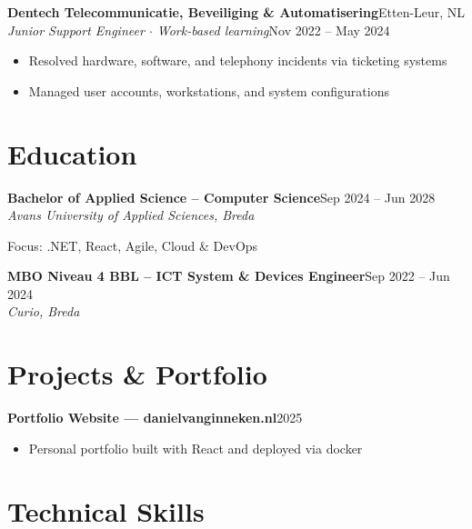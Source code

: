 \documentclass[a4paper,10pt]{article}
\newcommand{\cventry}[4]{%
  {\textbf{#1}}\hfill{\small\color{lightgray}#2}\\
  {\textit{#3}}\hfill{\small\color{lightgray}#4}\vspace{2pt}%
}
\newcommand{\cvsimple}[2]{%
  {\textbf{#1}}\hfill{\small\color{lightgray}#2}\vspace{1pt}%
}
\begin{document}
\vspace{4pt}

\cventry{Dentech Telecommunicatie, Beveiliging \& Automatisering}{Etten-Leur, NL}%
        {Junior Support Engineer $\cdot$ Work-based learning}{Nov 2022 -- May 2024}
\begin{itemize}
  \item Resolved hardware, software, and telephony incidents via ticketing systems
  \item Managed user accounts, workstations, and system configurations
\end{itemize}

\section{Education}

\cventry{Bachelor of Applied Science -- Computer Science}{Sep 2024 -- Jun 2028}%
        {Avans University of Applied Sciences, Breda}{}
\vspace{-1pt}
{\small Focus: .NET, React, Agile, Cloud \& DevOps}

\vspace{4pt}

\cventry{MBO Niveau 4 BBL -- ICT System \& Devices Engineer}{Sep 2022 -- Jun 2024}%
        {Curio, Breda}{}

\section{Projects \& Portfolio}

\cvsimple{Portfolio Website --- danielvanginneken.nl}{2025}
\begin{itemize}
  \item Personal portfolio built with React and deployed via docker
\end{itemize}

\vspace{4pt}

\section{Technical Skills}
\end{document}
